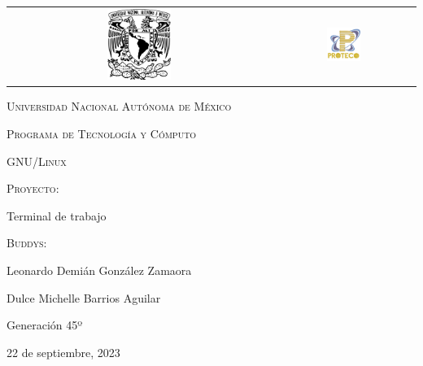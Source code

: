 \documentclass{article}
\begin{document}
\thispagestyle{empty}
\begin{titlepage}
\centering
\begin{center}
\begin{tabular}{c c}
\includegraphics[width=0.25\textwidth]{gg.png}\hspace{5cm}&\hspace{6cm}\includegraphics[width=0.25\textwidth]{download.png}\\
\end{tabular}
\end{center}

{\scshape\LARGE Universidad Nacional Autónoma de México \par}
\vspace{2cm}
{\scshape\Large Programa de Tecnología y Cómputo \par}
{\scshape\Large GNU/Linux \par}
\vspace{2cm}
{\scshape\Large Proyecto: \par}
{\Large Terminal de trabajo \par}
\vfill
{\scshape\Large Buddys: \par}
{\Large Leonardo Demián González Zamaora \par}
{\Large Dulce Michelle Barrios Aguilar \par}

\vfill
{\Large Generación 45º\par}
\vfill
{\Large 22 de septiembre, 2023 \par}
\end{titlepage}
\end{document}
